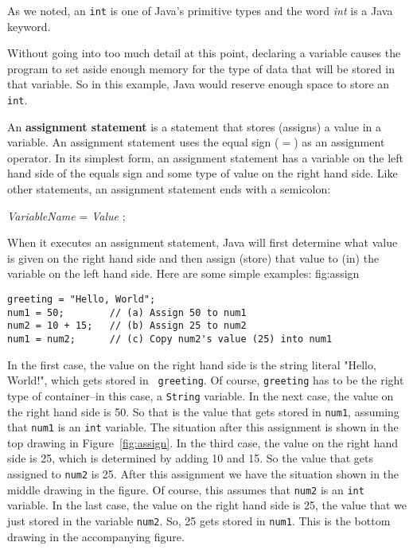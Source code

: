 \noindent As we noted, an {\tt int} is one of Java's primitive types
and the word {\it int} is a Java keyword. 

Without going into too much detail at this point, declaring a
variable causes the program to set aside enough memory for the type of
data that will be stored in that variable. So in this example, Java
would reserve enough space to store an {\tt int}.

An {\bf assignment statement} is a statement that stores (assigns) a
value in a variable.  An assignment statement uses the equal sign ($=$)
as an assignment operator. In its simplest form, an assignment
statement has a variable on the left hand side of the equals sign and
some type of value on the right hand side. Like other statements, an
assignment statement ends with a semicolon:

\begin{extract}
{\it VariableName} = {\it Value} ;
\end{extract}

\noindent When it executes an assignment statement, Java will first
determine what value is given on the right hand side and then
assign (store) that value to (in) the variable on the left hand
side. Here are some simple examples:
{fig:assign}

\begin{jjjlisting}
\begin{lstlisting}
greeting = "Hello, World";
num1 = 50;        // (a) Assign 50 to num1
num2 = 10 + 15;   // (b) Assign 25 to num2
num1 = num2;      // (c) Copy num2's value (25) into num1
\end{lstlisting}
\end{jjjlisting}

\noindent In the first case, the value on the right hand 
side is the string literal "Hello, World!", which gets stored in {\tt
greeting}. Of course, {\tt greeting} has to be the right type of
container--in this case, a {\tt String} variable.  In the next case,
the value on the right hand side is 50. So that is the value that gets
stored in {\tt num1}, assuming that {\tt num1} is an {\tt int}
variable. The situation after this assignment is shown in the top
drawing in Figure~\ref{fig:assign}.  In the third case, the value on
the right hand side is 25, which is determined by adding 10 and 15. So
the value that gets assigned to {\tt num2} is 25. After this
assignment we have the situation shown in the middle drawing in the
figure. Of course, this assumes that {\tt num2} is an {\tt int}
variable.  In the last case, the value on the right hand side is 25,
the value that we just stored in the variable {\tt num2}. So, 25 gets
stored in {\tt num1}. This is the bottom drawing in the accompanying
figure.

